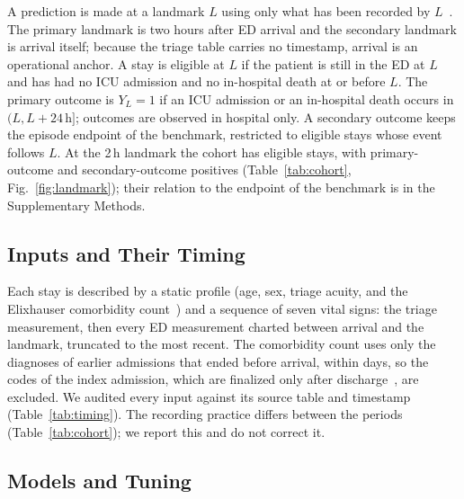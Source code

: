 A prediction is made at a landmark $L$ using only what has been recorded by $L$~\cite{vanhouwelingen2007landmarking}. The primary landmark is two
hours after ED arrival and the secondary landmark is arrival itself; because the triage table carries no timestamp, arrival is an operational anchor. A stay is eligible at $L$ if the patient is still in the ED
at $L$ and has had no ICU admission and no in-hospital death at or before $L$. The primary outcome is
$Y_L = 1$ if an ICU admission or an in-hospital death occurs in $(L, L + 24\,\mathrm{h}]$; outcomes are observed in hospital
only. A secondary outcome keeps the episode endpoint of the benchmark, restricted to eligible stays whose event follows $L$. At the 2\,h landmark the
cohort has \RVHtwoEligibleTotal{} eligible stays, with \RVHtwoPrimaryPositivesTotal{} primary-outcome and \RVHtwoSecondaryPositivesTotal{}
secondary-outcome positives (Table~\ref{tab:cohort}, Fig.~\ref{fig:landmark}); their relation to the endpoint of the benchmark is in the Supplementary Methods.




\subsection{Inputs and Their Timing}
\label{sec:methods-inputs}

Each stay is described by a static profile (age, sex, triage acuity, and the Elixhauser comorbidity count~\cite{quan2005coding}) and a sequence of
seven vital signs: the triage measurement, then every ED measurement charted between arrival and the landmark, truncated to the
\RVTEdHtwo{} most recent. The comorbidity count uses only the diagnoses of earlier admissions that ended before arrival, within \RVElixWindowDays{} days, so the codes of the index admission, which are finalized only after discharge~\cite{ramadan2025icdleakage}, are excluded. We audited every input against its source table and
timestamp (Table~\ref{tab:timing}). The recording practice differs between the periods (Table~\ref{tab:cohort}); we report this and do not correct it.



\subsection{Models and Tuning}
\label{sec:methods-models}


